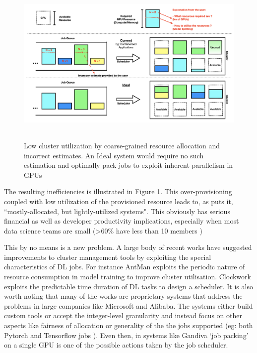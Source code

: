 \begin{figure}
  \includegraphics[width=\textwidth,height=8cm]{figures/pic.jpeg}
  \caption{Low cluster utilization by coarse-grained resource allocation and incorrect estimates. An Ideal system would require no such estimation and optimally pack jobs to exploit inherent parallelism in GPUs}
\end{figure} 

The resulting inefficiencies is illustrated in Figure 1. This over-provisioning
coupled with low utilization of the provisioned resource leads to, as
\cite{delimitrou} puts it, ``mostly-allocated, but lightly-utilized systems".
This obviously has serious financial as well as developer productivity
implications, especially when most data science teams are small (>60\% have less
than 10 members \cite{kaggle})

This by no means is a new problem. A large body of recent works have suggested
improvements to cluster management tools by exploiting the special
characteristics of DL jobs. For instance AntMan \cite{antman} exploits the
periodic nature of resource consumption in model training to improve cluster
utilisation. Clockwork \cite{clockwork} exploits the predictable time duration
of DL tasks to design a scheduler. It is also worth noting that many of the
works are proprietary systems that address the problems in large companies like
Microsoft and Alibaba. The systems either build custom tools or accept the
integer-level granularity and instead focus on other aspects like fairness of
allocation or generality of the the jobs supported (eg: both Pytorch and
Tensorflow jobs ).  Even then, in systems like Gandiva \cite{gandiva} `job
packing' on a single GPU is one of the possible actions taken by the job
scheduler.


